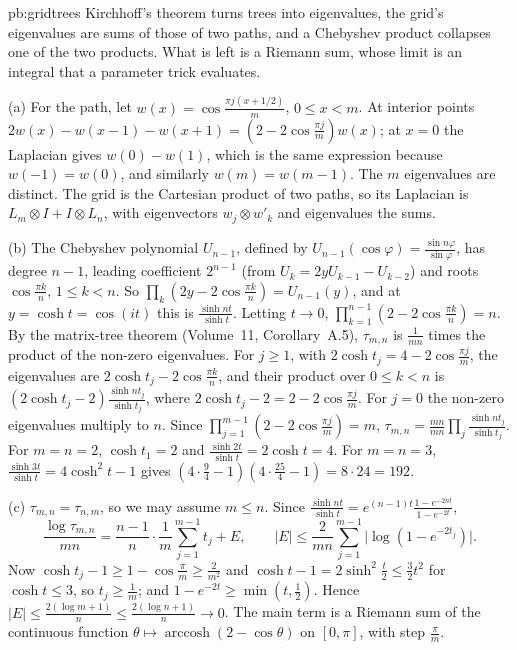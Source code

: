 \begin{solution}{pb:gridtrees}
\idea Kirchhoff's theorem turns trees into eigenvalues, the grid's eigenvalues are sums of those of two paths, and a Chebyshev product collapses one of the two products. What is left is a
Riemann sum, whose limit is an integral that a parameter trick evaluates.

\writeup (a) For the path, let $w(x)=\cos\frac{\pi j(x+1/2)}m$, $0\le x<m$. At interior points $2w(x)-w(x-1)-w(x+1)=(2-2\cos\frac{\pi j}m)w(x)$; at $x=0$ the Laplacian gives $w(0)-w(1)$, which is the
same expression because $w(-1)=w(0)$, and similarly $w(m)=w(m-1)$. The $m$ eigenvalues are distinct. The grid is the Cartesian product of two paths, so its Laplacian is
$L_m\otimes I+I\otimes L_n$, with eigenvectors $w_j\otimes w'_k$ and eigenvalues the sums.

(b) The Chebyshev polynomial $U_{n-1}$, defined by $U_{n-1}(\cos\varphi)=\frac{\sin n\varphi}{\sin\varphi}$, has degree $n-1$, leading coefficient $2^{n-1}$ (from $U_k=2yU_{k-1}-U_{k-2}$) and roots
$\cos\frac{\pi k}n$, $1\le k<n$. So $\prod_k(2y-2\cos\frac{\pi k}n)=U_{n-1}(y)$, and at $y=\cosh t=\cos(it)$ this is $\frac{\sinh nt}{\sinh t}$. Letting $t\to0$, $\prod_{k=1}^{n-1}(2-2\cos\frac{\pi k}n)=n$.
By the matrix-tree theorem (Volume~11, Corollary~A.5), $\tau_{m,n}$ is $\frac1{mn}$ times the product of the non-zero eigenvalues. For $j\ge1$, with $2\cosh t_j=4-2\cos\frac{\pi j}m$, the eigenvalues
are $2\cosh t_j-2\cos\frac{\pi k}n$, and their product over $0\le k<n$ is $(2\cosh t_j-2)\frac{\sinh nt_j}{\sinh t_j}$, where $2\cosh t_j-2=2-2\cos\frac{\pi j}m$. For $j=0$ the non-zero eigenvalues multiply
to $n$. Since $\prod_{j=1}^{m-1}(2-2\cos\frac{\pi j}m)=m$, $\tau_{m,n}=\frac{mn}{mn}\prod_j\frac{\sinh nt_j}{\sinh t_j}$. For $m=n=2$, $\cosh t_1=2$ and $\frac{\sinh2t}{\sinh t}=2\cosh t=4$. For $m=n=3$,
$\frac{\sinh3t}{\sinh t}=4\cosh^2t-1$ gives $(4\cdot\frac94-1)(4\cdot\frac{25}4-1)=8\cdot24=192$.

(c) $\tau_{m,n}=\tau_{n,m}$, so we may assume $m\le n$. Since $\frac{\sinh nt}{\sinh t}=e^{(n-1)t}\frac{1-e^{-2nt}}{1-e^{-2t}}$,
\[
\frac{\log\tau_{m,n}}{mn}=\frac{n-1}n\cdot\frac1m\sum_{j=1}^{m-1}t_j+E,\qquad|E|\le\frac2{mn}\sum_{j=1}^{m-1}\bigl|\log(1-e^{-2t_j})\bigr|.
\]
Now $\cosh t_j-1\ge1-\cos\frac\pi m\ge\frac2{m^2}$ and $\cosh t-1=2\sinh^2\frac t2\le\frac32t^2$ for $\cosh t\le3$, so $t_j\ge\frac1m$; and $1-e^{-2t}\ge\min(t,\frac12)$. Hence
$|E|\le\frac{2(\log m+1)}n\le\frac{2(\log n+1)}n\to0$. The main term is a Riemann sum of the continuous function $\theta\mapsto\operatorname{arccosh}(2-\cos\theta)$ on $[0,\pi]$, with step $\frac\pi m$.


\end{solution}

